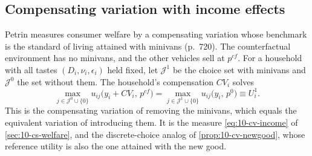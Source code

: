 \subsection{Compensating variation with income effects}\label{sec:10-petrin-cv}

Petrin measures consumer welfare by a compensating variation whose benchmark is the standard of living attained with
minivans (p.~720). The counterfactual environment has no minivans, and the other vehicles sell at $p^{cf}$. For a
household with all tastes $(D_i, \nu_i, \epsilon_i)$ held fixed, let $\mathcal{J}^1$ be the choice set with minivans
and $\mathcal{J}^0$ the set without them. The household's compensation $CV_i$ solves
\begin{equation}\label{eq:10-petrin-cvdef}
  \max_{j \in \mathcal{J}^0 \cup \{0\}} u_{ij}\bigl(y_i + CV_i,\, p^{cf}\bigr)
  = \max_{j \in \mathcal{J}^1 \cup \{0\}} u_{ij}\bigl(y_i,\, p^{0}\bigr) \equiv U_i^1 .
\end{equation}
This is the compensating variation of removing the minivans, which equals the equivalent variation of introducing
them. It is the measure \eqref{eq:10-cv-income} of \cref{sec:10-cs-welfare}, and the discrete-choice analog of
\cref{prop:10-cv-newgood}, whose reference utility is also the one attained with the new good.

